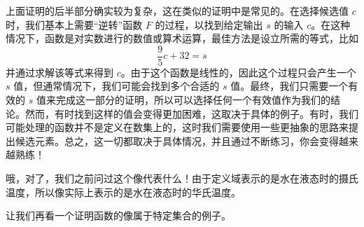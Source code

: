 上面证明的后半部分确实较为复杂，这在类似的证明中是常见的。在选择候选值 $c$ 时，我们基本上需要``逆转''函数 $F$ 的过程，以找到给定输出 $s$ 的输入 $c$。在这种情况下，函数是对实数进行的数值或算术运算，最佳方法是设立所需的等式，比如
\[\frac{9}{5}c + 32 = s\]
并通过求解该等式来得到 $c$。由于这个函数是线性的，因此这个过程只会产生一个 $s$ 值，但通常情况下，我们可能会找到多个合适的 $s$ 值。最终，我们只需要一个有效的 $s$ 值来完成这一部分的证明，所以可以选择任何一个有效值作为我们的结论。然而，有时找到这样的值会变得更加困难，这取决于具体的例子。有时，我们可能处理的函数并不是定义在数集上的，这时我们需要使用一些更抽象的思路来提出候选元素。总之，这一切都取决于具体情况，并且通过不断练习，你会变得越来越熟练！

哦，对了，我们之前问过这个像代表什么！由于定义域表示的是水在液态时的摄氏温度，所以像实际上表示的是水在液态时的华氏温度。

让我们再看一个证明函数的像属于特定集合的例子。\\

